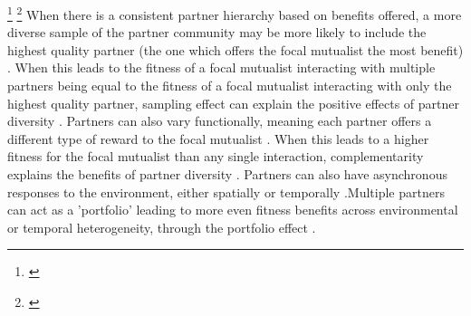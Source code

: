 \documentclass[11pt]{article}\usepackage[sc]{mathpazo} %
\newcommand{\tom}[2]{{\color{red}{#1}}\footnote{\textit{\color{red}{#2}}}}
\begin{document}
  \tom{This variation in partners can lead to net benefits, no net benefits, or net costs for the focal mutualist.}{Are there examples of all of these?}
\tom{In this study I focus on the positive effects of partner diversity which can be explained by several mechanisms described below.}{``I'' is not the right pronoun for a multi-autho paper, and the tone of this sentence makes your focus on positive effects seem arbitrary and not well supported.} 
When there is a consistent partner hierarchy based on benefits offered, a more diverse sample of the partner community may be more likely to include the highest quality partner (the one which offers the focal mutualist the most benefit) \cite{Frederickson2013}.
When this leads to the fitness of a focal mutualist interacting with multiple partners being equal to the fitness of a focal mutualist interacting with only the highest quality partner, sampling effect can explain the positive effects of partner diversity \cite{Batstone2018}. 
Partners can also vary functionally, meaning each partner offers a different type of reward to the focal mutualist \cite{Stachowicz2005,Bronstein2006,Stanton2003}.
When this leads to a higher fitness for the focal mutualist than any single interaction, complementarity explains the benefits of partner diversity \cite{Batstone2018}. 
Partners can also have asynchronous responses to the environment, either spatially \cite{Ollerton2006} or temporally \cite{Alarcon2008}.Multiple partners can act as a 'portfolio' leading to more even fitness benefits across environmental or temporal heterogeneity, through the portfolio effect \cite{Batstone2018,Lazaro2022}.
\end{document}

